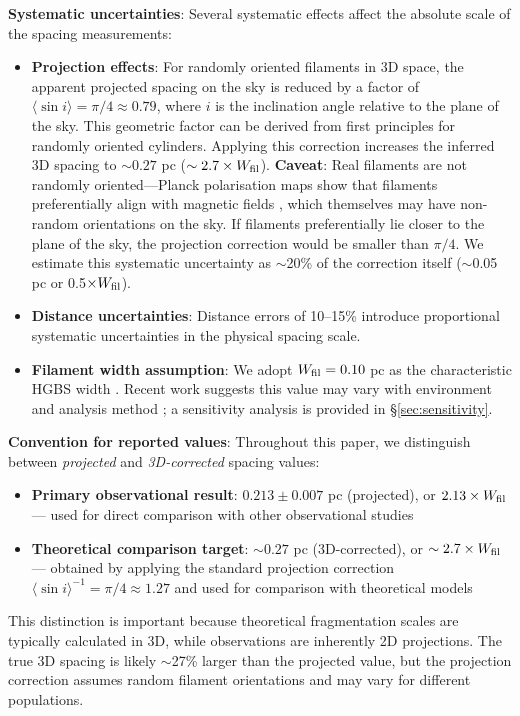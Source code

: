 \documentclass[11pt,a4paper]{article}
\begin{document}
\textbf{Systematic uncertainties}: Several systematic effects affect the absolute scale of the spacing measurements:
\begin{itemize}
    \item \textbf{Projection effects}: For randomly oriented filaments in 3D space, the apparent projected spacing on the sky is reduced by a factor of $\langle \sin i \rangle = \pi/4 \approx 0.79$, where $i$ is the inclination angle relative to the plane of the sky. This geometric factor can be derived from first principles for randomly oriented cylinders. Applying this correction increases the inferred 3D spacing to $\sim0.27$ pc ($\sim2.7\times W_{\rm fil}$). \textbf{Caveat}: Real filaments are not randomly oriented—Planck polarisation maps show that filaments preferentially align with magnetic fields \citep{Planck2016}, which themselves may have non-random orientations on the sky. If filaments preferentially lie closer to the plane of the sky, the projection correction would be smaller than $\pi/4$. We estimate this systematic uncertainty as $\sim$20\% of the correction itself ($\sim$0.05 pc or 0.5$\times W_{\rm fil}$).
    \item \textbf{Distance uncertainties}: Distance errors of 10--15\% introduce proportional systematic uncertainties in the physical spacing scale.
    \item \textbf{Filament width assumption}: We adopt $W_{\rm fil} = 0.10$ pc as the characteristic HGBS width \citep{Arzoumanian2011}. Recent work suggests this value may vary with environment and analysis method \citep{Panopoulou2022, Hacar2023}; a sensitivity analysis is provided in \S\ref{sec:sensitivity}.
\end{itemize}

\textbf{Convention for reported values}: Throughout this paper, we distinguish between \textit{projected} and \textit{3D-corrected} spacing values:
\begin{itemize}
    \item \textbf{Primary observational result}: $0.213 \pm 0.007$ pc (projected), or $2.13\times W_{\rm fil}$ — used for direct comparison with other observational studies
    \item \textbf{Theoretical comparison target}: $\sim0.27$ pc (3D-corrected), or $\sim2.7\times W_{\rm fil}$ — obtained by applying the standard projection correction $\langle \sin i \rangle^{-1} = \pi/4 \approx 1.27$ and used for comparison with theoretical models
\end{itemize}
This distinction is important because theoretical fragmentation scales are typically calculated in 3D, while observations are inherently 2D projections. The true 3D spacing is likely $\sim$27\% larger than the projected value, but the projection correction assumes random filament orientations and may vary for different populations.
\end{document}
